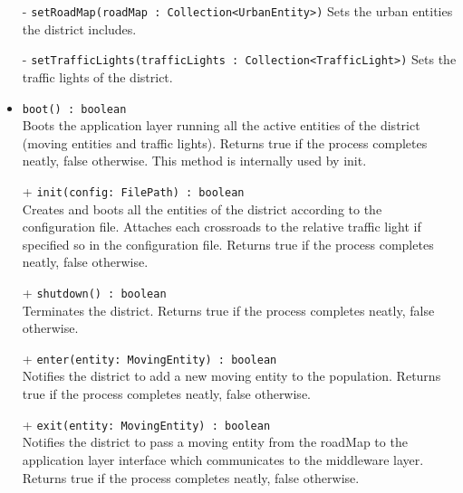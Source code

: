 \begin{itemize}
\begin{itemize}
    \item[-] \texttt{setRoadMap(roadMap : Collection<UrbanEntity>)}
    Sets the urban entities the district includes.
    \item[-] \texttt{setTrafficLights(trafficLights : Collection<TrafficLight>)}
    Sets the traffic lights of the district.
    \item \texttt{boot() : boolean} \\
    Boots the application layer running all the active entities of the 
    district (moving entities and traffic lights).
    Returns true if the process completes neatly, false otherwise. 
    This method is internally used by init.
    \item[+] \texttt{init(config: FilePath) : boolean} \\
    Creates and boots all the entities of the district according to the 
    configuration file. Attaches each crossroads to the relative traffic light
    if specified so in the configuration file. 
    Returns true if the process completes neatly, false otherwise.
    \item[+] \texttt{shutdown() : boolean} \\
    Terminates the district. Returns true if the process completes neatly,
    false otherwise.
    \item[+] \texttt{enter(entity: MovingEntity) : boolean} \\
    Notifies the district to add a new moving entity to the population.
    Returns true if the process completes neatly, false otherwise.
    \item[+] \texttt{exit(entity: MovingEntity) : boolean} \\
    Notifies the district to pass a moving entity from the roadMap to the 
    application layer interface which communicates to the middleware layer.
    Returns true if the process completes neatly, false otherwise.
  \end{itemize}
\end{itemize} 
